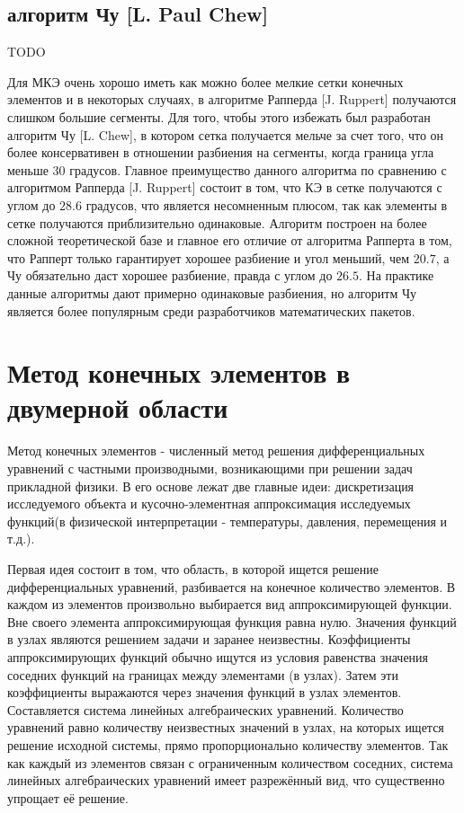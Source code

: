 \documentclass[14pt]{extreport}
\begin{document}
\section{алгоритм Чу [L. Paul Chew]}

TODO

Для МКЭ очень хорошо иметь как можно более мелкие сетки конечных элементов и в некоторых случаях, в алгоритме Рапперда [J. Ruppert] получаются слишком большие сегменты. Для того, чтобы этого избежать был разработан алгоритм Чу [L. Chew], в котором сетка получается мельче за счет того, что он более консервативен в отношении разбиения на сегменты, когда граница угла меньше $30$ градусов. Главное преимущество данного алгоритма по сравнению с алгоритмом Рапперда [J. Ruppert] состоит в том, что КЭ в сетке получаются с углом до $28.6$ градусов, что является несомненным плюсом, так как элементы в сетке получаются приблизительно одинаковые. Алгоритм построен на более сложной теоретической базе \cite{bib:triangle:chew} и главное его отличие от алгоритма Рапперта в том, что Рапперт только гарантирует хорошее разбиение и угол меньший, чем $20.7$, а Чу обязательно даст хорошее разбиение, правда с углом до $26.5$. На практике данные алгоритмы дают примерно одинаковые разбиения, но алгоритм Чу является более популярным среди разработчиков математических пакетов.


\chapter{Метод конечных элементов в двумерной области}

Метод конечных элементов \cite{bib:fem:pankratov, bib:fem:zenkevich} - численный метод решения дифференциальных уравнений с частными производными, возникающими при решении задач прикладной физики.
	В его основе лежат две главные идеи: дискретизация исследуемого объекта и кусочно-элементная аппроксимация исследуемых функций(в физической интерпретации - температуры, давления, перемещения и т.д.).

Первая идея состоит в том, что область, в которой ищется решение дифференциальных уравнений, разбивается на конечное количество элементов. В каждом из элементов произвольно выбирается вид аппроксимирующей функции. Вне своего элемента аппроксимирующая функция равна нулю. Значения функций в узлах являются решением задачи и заранее неизвестны. Коэффициенты аппроксимирующих функций обычно ищутся из условия равенства значения соседних функций на границах между элементами (в узлах). Затем эти коэффициенты выражаются через значения функций в узлах элементов. Составляется система линейных алгебраических уравнений. Количество уравнений равно количеству неизвестных значений в узлах, на которых ищется решение исходной системы, прямо пропорционально количеству элементов. Так как каждый из элементов связан с ограниченным количеством соседних, система линейных алгебраических уравнений имеет разрежённый вид, что существенно упрощает её решение. 
\end{document}
